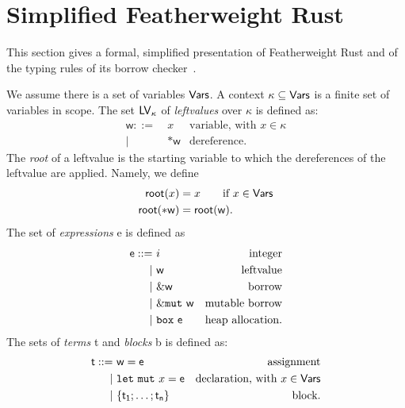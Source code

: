 \section{Simplified Featherweight Rust}\label{sec:featherweight}

This section gives a formal, simplified presentation of Featherweight Rust
and of the typing rules of its borrow checker~\cite{Pearce21}.

\begin{definition}
  We assume there is a set of variables $\mathsf{Vars}$.
  A context $\kappa\subseteq\mathsf{Vars}$ is a finite set of variables in scope.
  The set $\mathsf{LV}_\kappa$ of \emph{leftvalues} over $\kappa$ is defined as:
  \begin{align*}
    \mathsf{w} ::= &\ x & \text{variable, with $x\in\kappa$}\\
    | &\ \mathtt{*}\mathsf{w} & \text{dereference.}
  \end{align*}
  The \emph{root} of a leftvalue is the starting variable to which the dereferences of the
  leftvalue are applied. Namely, we define
  \begin{align*}
    \mathsf{root}(x) &= x\qquad\text{if $x\in\mathsf{Vars}$}\\
    \mathsf{root}(\mathtt{*}\mathsf{w}) &= \mathsf{root}(\mathsf{w}).
  \end{align*}
  The set of \emph{expressions} \textsf{e} is defined as
  \begin{align*}
    \mathsf{e} ::= &\ i & \text{integer}\\
    | &\ \mathsf{w} & \text{leftvalue}\\
    | &\ \&\mathsf{w} & \text{borrow}\\
    | &\ \&\mathtt{mut}\ \mathsf{w} & \text{mutable borrow}\\
    | &\ \mathtt{box}\ \mathsf{e} & \text{heap allocation.}
  \end{align*}
  The sets of \emph{terms} \textsf{t} and \emph{blocks} \textsf{b} is defined as:
  \begin{align*}
    \mathsf{t} ::= &\ \mathsf{w}=\mathsf{e} & \text{assignment}\\
    | &\ \mathtt{let\ mut}\ x=\mathsf{e} & \text{declaration, with $x\in\mathsf{Vars}$}\\
    | &\ \{\mathsf{t_1};\ldots;\mathsf{t_n}\} & \text{block.}
  \end{align*}
\end{definition}


